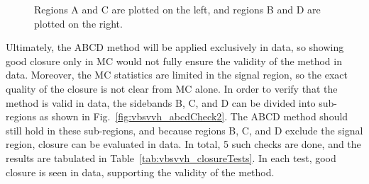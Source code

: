 \begin{figure}[htb]
    \centering
    \qquad
    \caption{
        Regions A and C are plotted on the left, and regions B and D are plotted on the right.
    }
    \label{fig:vbsvvh_abcd_closureMass}
\end{figure}

Ultimately, the ABCD method will be applied exclusively in data, so showing good closure only in MC would not fully ensure the validity of the method in data. 
Moreover, the MC statistics are limited in the signal region, so the exact quality of the closure is not clear from MC alone. 
In order to verify that the method is valid in data, the sidebands B, C, and D can be divided into sub-regions as shown in Fig.~\ref{fig:vbsvvh_abcdCheck2}. 
The ABCD method should still hold in these sub-regions, and because regions B, C, and D exclude the signal region, closure can be evaluated in data. 
In total, 5 such checks are done, and the results are tabulated in Table~\ref{tab:vbsvvh_closureTests}. 
In each test, good closure is seen in data, supporting the validity of the method.

